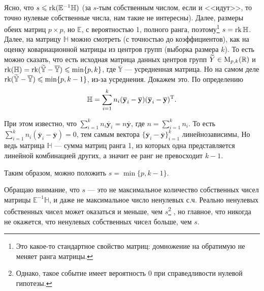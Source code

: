 Ясно, что $s \leqslant \operatorname{rk}(\mathbb E^{-1} \mathbb H)$ (за $s$-тым собственным числом, если и <<идут>>, то точно нулевые собственные числа, нам такие не интересны).
Далее, размеры обеих матриц $p \times p$, но $\mathbb E$, с вероятностью 1, полного ранга, поэтому\footnote{\color{blue} Это какое-то стандартное свойство матриц: домножение
на обратимую не меняет ранга матрицы.}
$s = \operatorname{rk}{\mathbb H}$. Далее, на матрицу $\mathbb H$ можно смотреть (с точностью до коэффициентов), как на оценку ковариационной матрицы из центров групп (выборка размера $k$).
То есть можно сказать, что есть исходная матрица данных центров групп $\widetilde Y \in \mathrm M_{p, k}(\mathbb{R})$ и $\operatorname{rk}(\mathbb H) = \operatorname{rk}(\mathbb {\widetilde Y} - \mathbb{\overline Y}) \leqslant \min\{p, k\}$,
где $\overline {\mathbb Y}$ --- усредненная матрица.
Но на самом деле $\operatorname{rk}(\mathbb {\widetilde Y} - \mathbb{\overline Y}) \leqslant \min\{p, k - 1\}$, из-за усреднения. Докажем это. По определению
\begin{gather*}
    \mathbb H = \sum_{i=1}^k n_i (\mathbf {\overline y}_{i} - \mathbf {\overline y}) (\mathbf {\overline y}_{i} - \mathbf {\overline y})^{\mathrm{T}}.
\end{gather*}

При этом известно, что $\sum_{i=1}^k n_i \mathbf {\overline y}_i = n \mathbf {\overline y}$, где $n = \sum_{i=1}^k n_i$.
То есть $\sum_{i = 1}^k n_i (\mathbf {\overline y}_i  - \mathbf {\overline y}) = 0$, тем самым вектора $\{\mathbf {\overline y}_i  - \mathbf {\overline y}\}_{i=1}^k$ линейнозависимы,
Но ведь матрица $\mathbb H$ --- сумма матриц ранга 1, из которых одна представляется линейной комбинацией других, а значит ее ранг не превосходит $k - 1$.

Таким образом, можно положить $s = \min\{p, k - 1\}$.

Обращаю внимание, что $s$ --- это не максимальное количество собственных чисел матрицы $\mathbb E^{-1} \mathbb H$, и даже не максимальное число ненулевых с.ч.
Реально ненулевых собственных чисел может оказаться и меньше, чем $s$\footnote{Однако, такое событие имеет вероятность 0 при справедливости нулевой гипотезы.}
, но главное, что никогда не окажется, что ненулевых собственных чисел больше, чем $s$.
